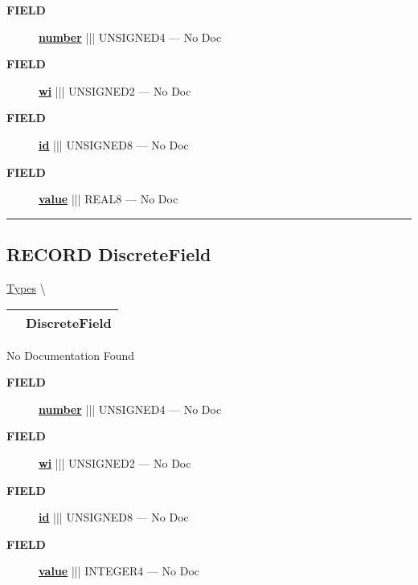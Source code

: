 \par
\begin{description}
\item [\colorbox{tagtype}{\color{white} \textbf{\textsf{FIELD}}}] \textbf{\underline{number}} ||| UNSIGNED4 --- No Doc
\item [\colorbox{tagtype}{\color{white} \textbf{\textsf{FIELD}}}] \textbf{\underline{wi}} ||| UNSIGNED2 --- No Doc
\item [\colorbox{tagtype}{\color{white} \textbf{\textsf{FIELD}}}] \textbf{\underline{id}} ||| UNSIGNED8 --- No Doc
\item [\colorbox{tagtype}{\color{white} \textbf{\textsf{FIELD}}}] \textbf{\underline{value}} ||| REAL8 --- No Doc
\end{description}





\rule{\linewidth}{0.5pt}
\subsection*{\textsf{\colorbox{headtoc}{\color{white} RECORD}
DiscreteField}}

\hypertarget{ecldoc:ml_core.types.discretefield}{}
\hspace{0pt} \hyperlink{ecldoc:ML_Core.Types}{Types} \textbackslash 

{\renewcommand{\arraystretch}{1.5}
\begin{tabularx}{\textwidth}{|>{\raggedright\arraybackslash}l|X|}
\hline
\hspace{0pt}\mytexttt{\color{red} } & \textbf{DiscreteField} \\
\hline
\end{tabularx}
}

\par





No Documentation Found







\par
\begin{description}
\item [\colorbox{tagtype}{\color{white} \textbf{\textsf{FIELD}}}] \textbf{\underline{number}} ||| UNSIGNED4 --- No Doc
\item [\colorbox{tagtype}{\color{white} \textbf{\textsf{FIELD}}}] \textbf{\underline{wi}} ||| UNSIGNED2 --- No Doc
\item [\colorbox{tagtype}{\color{white} \textbf{\textsf{FIELD}}}] \textbf{\underline{id}} ||| UNSIGNED8 --- No Doc
\item [\colorbox{tagtype}{\color{white} \textbf{\textsf{FIELD}}}] \textbf{\underline{value}} ||| INTEGER4 --- No Doc
\end{description}






